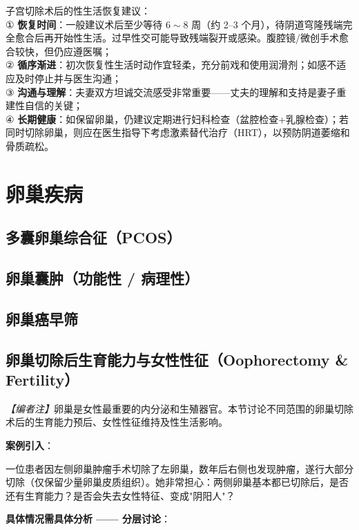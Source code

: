 \begin{tcolorbox}[colback=pink!5!white,colframe=red!50!black,title=贴心小叮咛]
子宫切除术后的性生活恢复建议：\\
① \textbf{恢复时间}：一般建议术后至少等待 $6\sim8$ 周（约 2--3 个月），待阴道穹隆残端完全愈合后再开始性生活。过早性交可能导致残端裂开或感染。腹腔镜/微创手术愈合较快，但仍应遵医嘱；\\
② \textbf{循序渐进}：初次恢复性生活时动作宜轻柔，充分前戏和使用润滑剂；如感不适应及时停止并与医生沟通；\\
③ \textbf{沟通与理解}：夫妻双方坦诚交流感受非常重要——丈夫的理解和支持是妻子重建性自信的关键；\\
④ \textbf{长期健康}：如保留卵巢，仍建议定期进行妇科检查（盆腔检查+乳腺检查）；若同时切除卵巢，则应在医生指导下考虑激素替代治疗（HRT），以预防阴道萎缩和骨质疏松。
\end{tcolorbox}

\section{卵巢疾病}
\subsection{多囊卵巢综合征（PCOS）}
\subsection{卵巢囊肿（功能性 / 病理性）}
\subsection{卵巢癌早筛}
\subsection{卵巢切除后生育能力与女性性征（Oophorectomy \& Fertility）}

\noindent\textit{【编者注】}卵巢是女性最重要的内分泌和生殖器官。本节讨论不同范围的卵巢切除术后的生育能力预后、女性性征维持及性生活影响。

\vspace{0.5em}
\noindent\textbf{案例引入}：

一位患者因左侧卵巢肿瘤手术切除了左卵巢，数年后右侧也发现肿瘤，遂行大部分切除（仅保留少量卵巢皮质组织）。她非常担心：两侧卵巢基本都已切除后，是否还有生育能力？是否会失去女性特征、变成"阴阳人"？

\vspace{0.5em}
\noindent\textbf{具体情况需具体分析 —— 分层讨论}：

